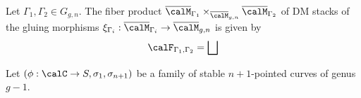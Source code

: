   \begin{theorem}
      Let $\Gamma_1,\Gamma_2 \in G_{g,n}$.
      The fiber product $\overline{\calM}_{\Gamma_1} \times_{\overline{\calM}_{g,n}} \overline{\calM}_{\Gamma_2}$ of DM stacks of the gluing morphisms $\xi_{\Gamma_i}: \overline{\calM}_{\Gamma_i} \to \overline{\calM}_{g,n}$ is given by 
      \[ \calF_{\Gamma_1,\Gamma_2} = \bigsqcup \]
  \end{theorem}

  \begin{example}
      Let $(\phi: \calC \to S, \sigma_1,\sigma_{n+1})$ be a family of stable $n+1$-pointed curves of genus $g-1$.

  \end{example}

